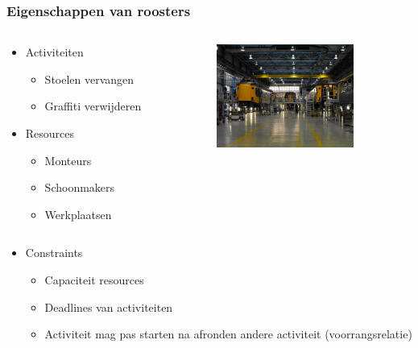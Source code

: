 \begin{frame}\frametitle{Eigenschappen van roosters}
	\begin{columns}[T]
	    \begin{column}{.4\textwidth}
			\begin{itemize}
		        \item Activiteiten
		        \begin{itemize}
		            \item Stoelen vervangen
		            \item Graffiti verwijderen      
		        \end{itemize}
		        \item Resources
	            \begin{itemize}
	                \item Monteurs
	                \item Schoonmakers
	                \item Werkplaatsen
	            \end{itemize}
		    \end{itemize}
	    \end{column}
	    \begin{column}{.5\textwidth}
	    	\includegraphics[width=4.5cm]{images/werkplaats.jpg}
	    \end{column}
  	\end{columns}
    \begin{itemize}
        \item Constraints
        \begin{itemize}
        	\item Capaciteit resources
            \item Deadlines van activiteiten
            \item Activiteit mag pas starten na afronden andere activiteit (voorrangsrelatie)
        \end{itemize}
    \end{itemize}
\end{frame}
